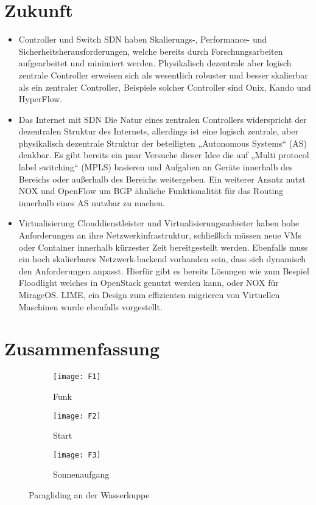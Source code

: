 \documentclass[twoside,12pt]{scrartcl}
\begin{document}
\section{Zukunft}
\begin{itemize}
	\item Controller und Switch
	SDN haben Skalierungs-, Performance- und Sicherheitsherausforderungen, welche bereits durch Forschungsarbeiten aufgearbeitet und minimiert werden. Physikalisch dezentrale aber logisch zentrale Controller erweisen sich als wesentlich robuster und besser skalierbar als ein zentraler Controller, Beispiele solcher Controller sind Onix, Kando und HyperFlow.
	\item Das Internet mit SDN
	Die Natur eines zentralen Controllers widerspricht der dezentralen Struktur des Internets, allerdings ist eine logisch zentrale, aber physikalisch dezentrale Struktur der beteiligten „Autonomous Systems“ (AS) denkbar. Es gibt bereits ein paar Versuche dieser Idee die auf „Multi protocol label switching“ (MPLS) basieren und Aufgaben an Geräte innerhalb des Bereichs oder außerhalb des Bereichs weitergeben. Ein weiterer Ansatz nutzt NOX und OpenFlow  um BGP ähnliche Funktionalität für das Routing innerhalb eines AS nutzbar zu machen.
	\item Virtualisierung
	Clouddienstleister und Virtualisierungsanbieter haben hohe Anforderungen an ihre Netzwerkinfrastruktur, schließlich müssen neue VMs oder Container innerhalb kürzester Zeit bereitgestellt werden. Ebenfalls muss ein hoch skalierbares Netzwerk-backend vorhanden sein, dass sich dynamisch den Anforderungen anpasst. Hierfür gibt es bereits Lösungen wie zum Bespiel Floodlight welches in OpenStack genutzt werden kann, oder NOX für MirageOS. LIME, ein Design zum effizienten migrieren von Virtuellen Maschinen wurde ebenfalls vorgestellt.
\end{itemize}

\section{Zusammenfassung}


\begin{figure}
	\centering
	\begin{subfigure}[t]{.3\linewidth}
		\texttt{[image: F1]}
		\caption{Funk}
		\label{fig:sub1}
	\end{subfigure}%
	\hfill
	\begin{subfigure}[t]{.3\linewidth}
		\texttt{[image: F2]}
		\caption{Start}
		\label{fig:sub2}
	\end{subfigure}
	\hfill
	\begin{subfigure}[t]{.3\linewidth}
		\texttt{[image: F3]}
		\caption{Sonnenaufgang}
		\label{fig:sub3}
	\end{subfigure}%
	\caption{Paragliding an der Wasserkuppe}
	\label{fig:paragliding}
\end{figure}
	
\end{document}
